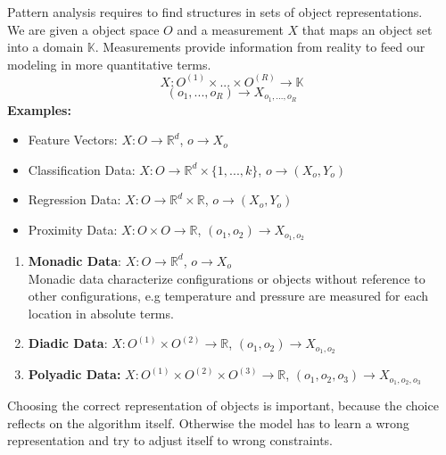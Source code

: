 \documentclass[twoside]{article}
\begin{document}
Pattern analysis requires to find structures in sets of object representations.\\
We are given a object space $O$ and a measurement $X$ that maps an object set into a domain $\mathbb{K}$. Measurements provide information from reality to feed our modeling in more quantitative terms.
\begin{equation*}
    X : O^{(1)} \times ... \times O^{(R)} \rightarrow \mathbb{K}
\end{equation*}
\begin{equation*}
    (o_1,...,o_R) \rightarrow X_{o_1,...,o_R}
\end{equation*}
\textbf{Examples:}
\begin{itemize}
    \item Feature Vectors: $X : O \rightarrow \mathbb{R}^d$, $o \rightarrow X _o$
    \item Classification Data: $X : O \rightarrow \mathbb{R}^d \times \{1,...,k\} $, $o \rightarrow (X _o, Y_o)$
    \item Regression Data: $X : O \rightarrow \mathbb{R}^d \times \mathbb{R}$, $o \rightarrow (X _o, Y_o)$
    \item Proximity Data: $X: O \times O \rightarrow \mathbb{R}$, $(o_1,o_2) \rightarrow X_{o_1,o_2}$
\end{itemize}
\renewcommand{\theenumi}{\alph{enumi}}
\begin{enumerate}
    \item \textbf{Monadic Data}: $X : O \rightarrow \mathbb{R}^d$, $o \rightarrow X _o$
    \\Monadic data characterize configurations or objects without reference to other configurations, e.g temperature and pressure are measured for each location in absolute terms.
    \item \textbf{Diadic Data}: $X: O^{(1)} \times O^{(2)} \rightarrow \mathbb{R}$, $(o_1,o_2) \rightarrow X_{o_1,o_2}$
    \item \textbf{Polyadic Data:} $X: O^{(1)} \times O^{(2)} \times O^{(3)} \rightarrow \mathbb{R}$, $(o_1,o_2,o_3) \rightarrow X_{o_1,o_2,o_3}$
\end{enumerate}
Choosing the correct representation of objects is important, because the choice reflects on the algorithm itself. Otherwise the model has to learn a wrong representation and try to adjust itself to wrong constraints.
\end{document}
